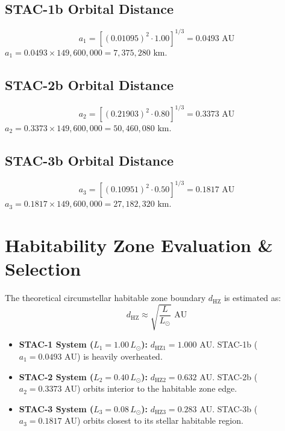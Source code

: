 \documentclass[journal,10pt,twocolumn]{IEEEtran}
\begin{document}
\subsection{STAC-1b Orbital Distance}
\begin{equation}
a_1 = \left[(0.01095)^2 \cdot 1.00\right]^{1/3} = 0.0493\text{ AU}
\end{equation}
$a_1 = 0.0493 \times 149,600,000 = 7,375,280\text{ km}$.

\subsection{STAC-2b Orbital Distance}
\begin{equation}
a_2 = \left[(0.21903)^2 \cdot 0.80\right]^{1/3} = 0.3373\text{ AU}
\end{equation}
$a_2 = 0.3373 \times 149,600,000 = 50,460,080\text{ km}$.

\subsection{STAC-3b Orbital Distance}
\begin{equation}
a_3 = \left[(0.10951)^2 \cdot 0.50\right]^{1/3} = 0.1817\text{ AU}
\end{equation}
$a_3 = 0.1817 \times 149,600,000 = 27,182,320\text{ km}$.

\section{Habitability Zone Evaluation \& Selection}
The theoretical circumstellar habitable zone boundary $d_{\text{HZ}}$ is estimated as:
\begin{equation}
d_{\text{HZ}} \approx \sqrt{\frac{L}{L_\odot}}\text{ AU}
\end{equation}

\begin{itemize}
    \item \textbf{STAC-1 System ($L_1 = 1.00\,L_\odot$):} $d_{\text{HZ1}} = 1.000\text{ AU}$. STAC-1b ($a_1 = 0.0493\text{ AU}$) is heavily overheated.
    \item \textbf{STAC-2 System ($L_2 = 0.40\,L_\odot$):} $d_{\text{HZ2}} = 0.632\text{ AU}$. STAC-2b ($a_2 = 0.3373\text{ AU}$) orbits interior to the habitable zone edge.
    \item \textbf{STAC-3 System ($L_3 = 0.08\,L_\odot$):} $d_{\text{HZ3}} = 0.283\text{ AU}$. STAC-3b ($a_3 = 0.1817\text{ AU}$) orbits closest to its stellar habitable region.
\end{itemize}
\end{document}
